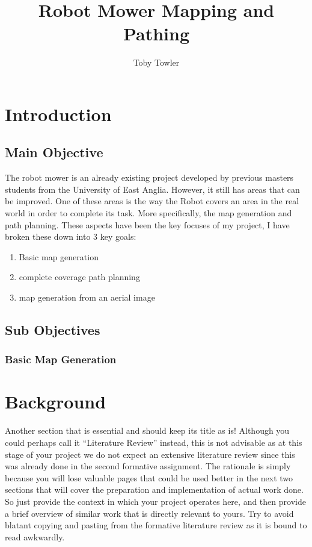 \documentclass[final]{cmpreport_02}
\title{Robot Mower Mapping and Pathing}
\author{Toby Towler}
\begin{document}
\section{Introduction}

\subsection{Main Objective}
The robot mower is an already existing project developed by previous masters students from the University of East Anglia. However, it still has areas that can be improved. One of these areas is the way the Robot covers an area in the real world in order to complete its task.
More specifically, the map generation and path planning. These aspects have been the key focuses of my project, I have broken these down into 3 key goals:
\begin{enumerate}
	\item Basic map generation
	\item complete coverage path planning
	\item map generation from an aerial image
\end{enumerate}

\subsection{Sub Objectives}


\subsubsection{Basic Map Generation}



\section{Background}

Another section that is essential and should keep its title as is! Although you could perhaps call it ``Literature Review'' instead, this is not advisable as at this stage of your project we do not expect an extensive literature review since this was already done in the second formative assignment. The rationale is simply because you will lose valuable pages that could be used better in the next two sections that will cover the preparation and implementation of actual work done. So just provide the context in which your project operates here, and then provide a brief overview of similar work that is directly relevant to yours. Try to avoid blatant copying and pasting from the formative literature review as it is bound to read awkwardly.
\end{document}
